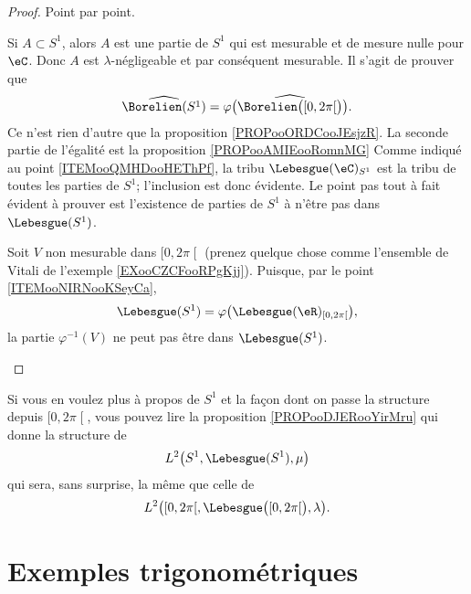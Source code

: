 \begin{proof}
	Point par point.
	\begin{subproof}
		Si \( A\subset S^1\), alors \( A\) est une partie de \( S^1\) qui est mesurable et de mesure nulle pour \( \eC\). Donc \( A\) est \( \lambda\)-négligeable et par conséquent mesurable.
		Il s'agit de prouver que
		\begin{equation}
			\widehat{\Borelien(S^1)}=\varphi\big( \widehat{\Borelien\big( \mathopen[ 0 , 2\pi \mathclose[ \big)} \big).
		\end{equation}
		Ce n'est rien d'autre que la proposition \ref{PROPooORDCooJEsjzR}. La seconde partie de l'égalité est la proposition \ref{PROPooAMIEooRomnMG}
		Comme indiqué au point \ref{ITEMooQMHDooHEThPf}, la tribu \( \Lebesgue(\eC)_{S^1}\) est la tribu de toutes les parties de \( S^1\); l'inclusion est donc évidente. Le point pas tout à fait évident à prouver est l'existence de parties de \( S^1\) à n'être pas dans \( \Lebesgue(S^1)\).

		Soit \( V\) non mesurable dans \( \mathopen[ 0 , 2\pi \mathclose[\) (prenez quelque chose comme l'ensemble de Vitali de l'exemple \ref{EXooCZCFooRPgKjj}). Puisque, par le point \ref{ITEMooNIRNooKSeyCa},
		\begin{equation}
			\Lebesgue(S^1)=\varphi\big( \Lebesgue(\eR)_{\mathopen[ 0 , 2\pi \mathclose[} \big),
		\end{equation}
		la partie \( \varphi^{-1}(V)\) ne peut pas être dans \( \Lebesgue(S^1)\).
	\end{subproof}
\end{proof}

Si vous en voulez plus à propos de \( S^1\) et la façon dont on passe la structure depuis \( \mathopen[ 0 , 2\pi \mathclose[\), vous pouvez lire la proposition \ref{PROPooDJERooYirMru} qui donne la structure de
\begin{equation}
	L^2\big( S^1,\Lebesgue(S^1), \mu \big)
\end{equation}
qui sera, sans surprise, la même que celle de
\begin{equation}
	L^2\big( \mathopen[ 0 , 2\pi \mathclose[,\Lebesgue\big( \mathopen[ 0 , 2\pi \mathclose[ \big), \lambda \big).
\end{equation}

\section{Exemples trigonométriques}


